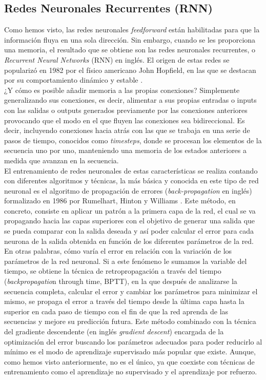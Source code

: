 \subsection{Redes Neuronales Recurrentes (RNN)} 

Como hemos visto, las redes neuronales \textit{feedforward} están habilitadas para que la información fluya en una sola dirección. Sin embargo, cuando se les proporciona una memoria, el resultado que se obtiene son las redes neuronales recurrentes, o \textit{Recurrent Neural Networks} (RNN) en inglés. El origen de estas redes se popularizó en 1982 por el físico americano John Hopfield, en las que se destacan por su comportamiento dinámico y estable \citep{berzal2019redes}. \\

¿Y cómo es posible añadir memoria a las propias conexiones? Simplemente generalizando sus conexiones, es decir, alimentar a sus propias entradas o inputs con las salidas o outputs generados previamente por las conexiones anteriores provocando que el modo en el que fluyen las conexiones sea bidireccional. Es decir, incluyendo conexiones hacia atrás con las que se trabaja en una serie de pasos de tiempo, conocidos como \textit{timesteps}, donde se procesan los elementos de la secuencia uno por uno, manteniendo una memoria de los estados anteriores a medida que avanzan en la secuencia.\\

El entrenamiento de redes neuronales de estas características se realiza contando con diferentes algoritmos y técnicas, la más básica y conocida en este tipo de red neuronal es el algoritmo de propagación de errores (\textit{back-propagation} en inglés) formalizado en 1986 por Rumelhart, Hinton y Williams \citep{berzal2019redes}. Este método, en concreto, consiste en aplicar un patrón a la primera capa de la red, el cual se va propagando hacia las capas superiores con el objetivo de generar una salida que se pueda comparar con la salida deseada y así poder calcular el error para cada neurona de la salida obtenida en función de los diferentes parámetros de la red. En otras palabras, cómo varía el error en relación con la variación de los parámetros de la red neuronal. Si a este fenómeno le sumamos la variable del tiempo, se obtiene la técnica de retropropagación a través del tiempo (\textit{backpropagatio}n through time, BPTT), en la que después de analizarse la secuencia completa, calcular el error y cambiar los parámetros para minimizar el mismo, se propaga el error a través del tiempo desde la última capa hasta la superior en cada paso de tiempo con el fin de que la red aprenda de las secuencias y mejore su predicción futura. 
Este método combinado con la técnica del gradiente descendente (en inglés \textit{gradient descent}) encargada de la optimización del error buscando los parámetros adecuados para poder reducirlo al mínimo es el modo de aprendizaje supervisado más popular que existe.  Aunque, como hemos visto anteriormente, no es el único, ya que coexiste con técnicas de entrenamiento como el aprendizaje no supervisado y el aprendizaje por refuerzo. \\

